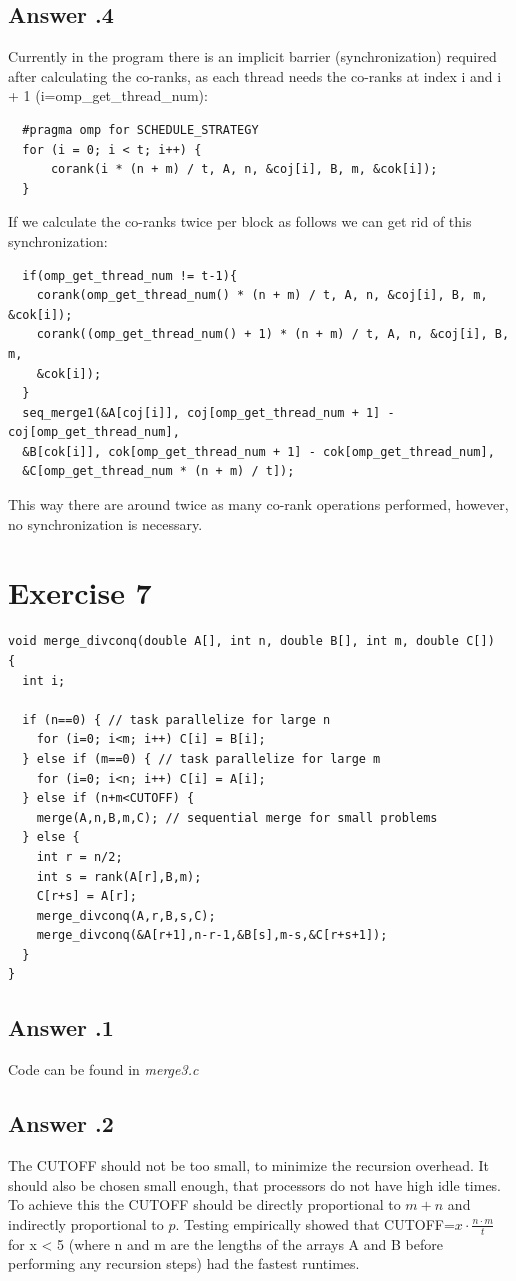 \documentclass[a4paper,%
11pt,%
DIV=12,
headsepline,%
headings=normal,
]{scrartcl}
\newcounter{curex}
\newcommand{\exercise}[1]{\section*{Exercise #1}\setcounter{curex}{#1}}
\newcommand{\answer}[1]{\subsection*{Answer \arabic{curex}.#1}}
\begin{document}
\answer{4}
Currently in the program there is an implicit barrier (synchronization) required after calculating the co-ranks, as each thread needs the co-ranks at index i and i + 1 (i=omp\_get\_thread\_num):\\
  \begin{minipage}[t]{1.0\linewidth}
\begin{lstlisting}
  #pragma omp for SCHEDULE_STRATEGY
  for (i = 0; i < t; i++) {
      corank(i * (n + m) / t, A, n, &coj[i], B, m, &cok[i]);
  }
  \end{lstlisting}
\end{minipage}
If we calculate the co-ranks twice per block as follows we can get rid of this synchronization:
  \begin{minipage}[t]{1.0\linewidth}
\begin{lstlisting}
  if(omp_get_thread_num != t-1){
    corank(omp_get_thread_num() * (n + m) / t, A, n, &coj[i], B, m, &cok[i]);
    corank((omp_get_thread_num() + 1) * (n + m) / t, A, n, &coj[i], B, m, 
    &cok[i]);
  }
  seq_merge1(&A[coj[i]], coj[omp_get_thread_num + 1] - coj[omp_get_thread_num], 
  &B[cok[i]], cok[omp_get_thread_num + 1] - cok[omp_get_thread_num], 
  &C[omp_get_thread_num * (n + m) / t]);
  \end{lstlisting}
\end{minipage}
This way there are around twice as many co-rank operations performed, however, no synchronization is necessary.

\exercise{7}

\begin{minipage}[t]{1.0\linewidth}
\begin{lstlisting}
void merge_divconq(double A[], int n, double B[], int m, double C[])
{
  int i;

  if (n==0) { // task parallelize for large n
    for (i=0; i<m; i++) C[i] = B[i];
  } else if (m==0) { // task parallelize for large m
    for (i=0; i<n; i++) C[i] = A[i];
  } else if (n+m<CUTOFF) {
    merge(A,n,B,m,C); // sequential merge for small problems
  } else {
    int r = n/2;
    int s = rank(A[r],B,m);
    C[r+s] = A[r];
    merge_divconq(A,r,B,s,C);
    merge_divconq(&A[r+1],n-r-1,&B[s],m-s,&C[r+s+1]);
  }
}
\end{lstlisting}
\end{minipage}

\answer{1}
Code can be found in \textit{merge3.c}
\answer{2}
The CUTOFF should not be too small, to minimize the recursion overhead. It should also be chosen small enough, that processors do not have high idle times. To achieve this the CUTOFF should be directly proportional to $m+n$ and indirectly proportional to $p$. Testing empirically showed that CUTOFF=$ x\cdot \frac{n \cdot m}{t}$ for x < 5 (where n and m are the lengths of the arrays A and B before performing any recursion steps) had the fastest runtimes.
\end{document}
